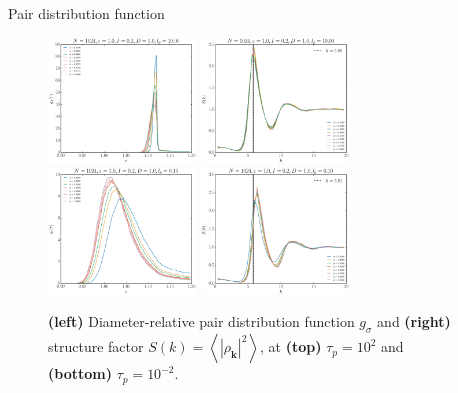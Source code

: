 \documentclass{beamer}
\begin{document}
\begin{frame}{Pair distribution function}

\begin{figure}
\centering
\includegraphics[width=0.35\textwidth]{g_No1024_Tl1000_Rj1000.eps}
\includegraphics[width=0.35\textwidth]{S_No1024_Tl1000_Rj1000.eps}\\
\includegraphics[width=0.35\textwidth]{g_No1024_Tl1000_Rn1000.eps}
\includegraphics[width=0.35\textwidth]{S_No1024_Tl1000_Rn1000.eps}
\caption{{\bf (left)} Diameter-relative pair distribution function $g_{\sigma}$ and {\bf(right)} structure factor $S(k) = \left<|\rho_{\boldsymbol{k}}|^2\right>$, at {\bf (top)} $\tau_p = 10^2$ and {\bf (bottom)} $\tau_p = 10^{-2}$.}
\end{figure}

\end{frame}
\end{document}
